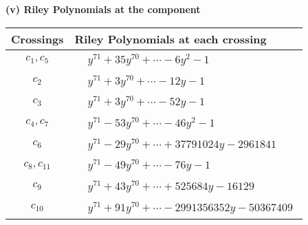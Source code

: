 \documentclass[1p]{elsarticle_modified}
\theoremstyle{definition}
\begin{document}
\newpage\renewcommand{\arraystretch}{1}
\flushleft \textbf{(v) Riley Polynomials at the component}\newline \\
\begin{tabular}{m{50pt}|m{274pt}}
Crossings & \hspace{64pt}Riley Polynomials at each crossing \\
\hline $$\begin{aligned}c_{1},c_{5}\end{aligned}$$&$\begin{aligned}
&y^{71}+35 y^{70}+\cdots-6 y^2-1
\end{aligned}$\\
\hline $$\begin{aligned}c_{2}\end{aligned}$$&$\begin{aligned}
&y^{71}+3 y^{70}+\cdots-12 y-1
\end{aligned}$\\
\hline $$\begin{aligned}c_{3}\end{aligned}$$&$\begin{aligned}
&y^{71}+3 y^{70}+\cdots-52 y-1
\end{aligned}$\\
\hline $$\begin{aligned}c_{4},c_{7}\end{aligned}$$&$\begin{aligned}
&y^{71}-53 y^{70}+\cdots-46 y^2-1
\end{aligned}$\\
\hline $$\begin{aligned}c_{6}\end{aligned}$$&$\begin{aligned}
&y^{71}-29 y^{70}+\cdots+37791024 y-2961841
\end{aligned}$\\
\hline $$\begin{aligned}c_{8},c_{11}\end{aligned}$$&$\begin{aligned}
&y^{71}-49 y^{70}+\cdots-76 y-1
\end{aligned}$\\
\hline $$\begin{aligned}c_{9}\end{aligned}$$&$\begin{aligned}
&y^{71}+43 y^{70}+\cdots+525684 y-16129
\end{aligned}$\\
\hline $$\begin{aligned}c_{10}\end{aligned}$$&$\begin{aligned}
&y^{71}+91 y^{70}+\cdots-2991356352 y-50367409
\end{aligned}$\\
\hline
\end{tabular}\\~\\
\end{document}
